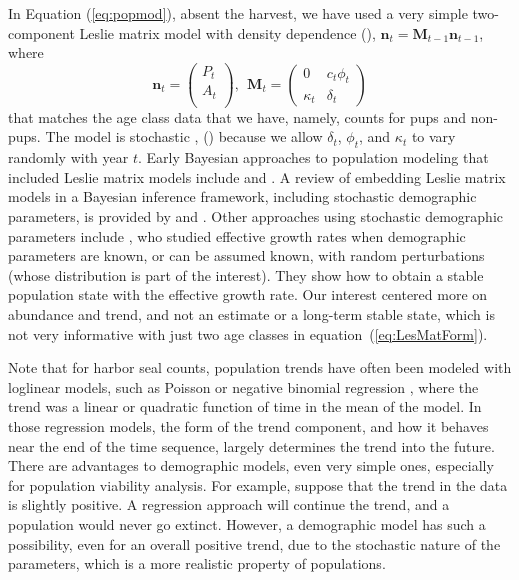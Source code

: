 \documentclass[]{risa}\usepackage[]{graphicx}\usepackage[]{color}
\newcommand{\bn}{\ensuremath{{\boldsymbol{\eta}}}}
\def\bn{\mathbf{n}}
\def\bM{\mathbf{M}}
\begin{document}
In Equation (\ref{eq:popmod}), absent the harvest, we have used a very simple two-component Leslie matrix model with density dependence (\citet[][p. 511]{Casw:matr:2001}), $\bn_t = \bM_{t-1}\bn_{t-1}$, where
\begin{equation} \label{eq:LesMatForm}
  \bn_t = \left(\begin{array}{c}
    P_t \\
    A_t \\
  \end{array}\right), \ \
  \bM_t = \left( \begin{array}{ll}
      0 & c_t\phi_t \\
      \kappa_t & \delta_t
  \end{array} \right)
\end{equation}
that matches the age class data that we have, namely, counts for pups and non-pups.  The model is stochastic \citep{Wade:Baye:2002}, (\citet[p. 452]{Casw:matr:2001}) because we allow $\delta_t$, $\phi_t$, and $\kappa_t$ to vary randomly with year $t$.  Early Bayesian approaches to population modeling that included Leslie matrix models include \citet{Raft:Give:Zeh:infe:1995} and \citet{Pool:Raft:infe:2000}. A review of embedding Leslie matrix models in a Bayesian inference framework, including stochastic demographic parameters, is provided by \citet{Gros:Crai:Hutc:Baye:2002} and \citet{Buck:Newm:Fern:Thom:embe:2007}.  Other approaches using stochastic demographic parameters include \citet{Cace:Cace:calc:2013}, who studied effective growth rates when demographic parameters are known, or can be assumed known, with random perturbations (whose distribution is part of the interest).  They show how to obtain a stable population state with the effective growth rate.  Our interest centered more on abundance and trend, and not an estimate or a long-term stable state, which is not very informative with just two age classes in equation~(\ref{eq:LesMatForm}). 

Note that for harbor seal counts, population trends have often been modeled with loglinear models, such as Poisson or negative binomial regression \citep{Ver:Fros:baye:2003,Smal:Pend:Pitc:tren:2003,Math:Pend:decl:2006}, where the trend was a linear or quadratic function of time in the mean of the model. In those regression models, the form of the trend component, and how it behaves near the end of the time sequence, largely determines the trend into the future.  There are advantages to demographic models, even very simple ones, especially for population viability analysis. For example, suppose that the trend in the data is slightly positive.  A regression approach will continue the trend, and a population would never go extinct.  However, a demographic model has such a possibility, even for an overall positive trend, due to the stochastic nature of the parameters, which is a more realistic property of populations.
\end{document}

